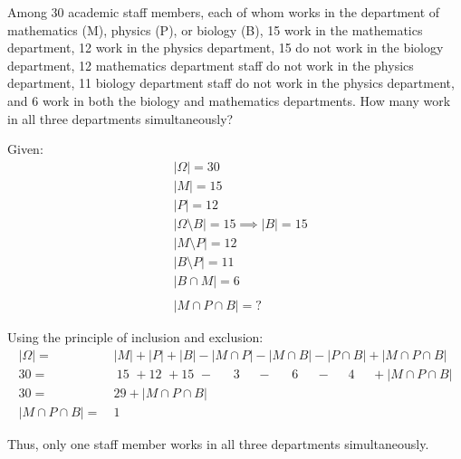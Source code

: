 \documentclass[a4paper,10pt]{article}
\begin{document}
\begin{problem}
	Among 30 academic staff members, each of whom works in the department of mathematics (M), physics (P), or biology (B), 15 work in the mathematics department, 12 work in the physics department, 15 do not work in the biology department, 12 mathematics department staff do not work in the physics department, 11 biology department staff do not work in the physics department, and 6 work in both the biology and mathematics departments. How many work in all three departments simultaneously?

	Given:
	\[
		\begin{aligned}
			&|\Omega| = 30 \\
			&|M| = 15 \\
			&|P| = 12 \\
			&|\Omega \setminus B| = 15 \implies |B| = 15\\
			&|M \setminus P| = 12 \\
			&|B \setminus P| = 11 \\
			&|B \cap M| = 6 \\ \\
			&|M \cap P \cap B| = ?
		\end{aligned}
	\]

	Using the principle of inclusion and exclusion:
	\[
		\begin{aligned}
			|\Omega| = &\ |M| + |P| + |B| - |M \cap P| - |M \cap B| - |P \cap B| + |M \cap P \cap B| \\ 
			30 = &\ \ 15 \,\,+ 12 \,\,+ 15\,\, - \quad\ \,\,3 \quad\,\,- \quad \ \,\,6 \quad\ \,- \quad\,\,4 \quad\,\,+ |M \cap P \cap B| \\
			30 = &\ 29 + |M \cap P \cap B| \\
			|M \cap P \cap B| = &\ 1
		\end{aligned}
	\]

	Thus, only one staff member works in all three departments simultaneously.
\end{problem}
\end{document}
